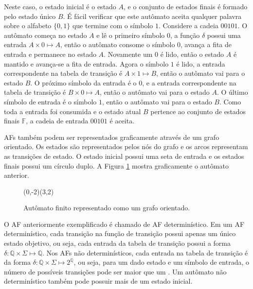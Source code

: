 \documentclass[12pt,a4paper]{article}
\let\vState=\origState
\begin{document}
Neste caso, o estado inicial é o estado $A$, e o conjunto de estados finais
é formado pelo estado único $B$. É fácil verificar que este autômato aceita
qualquer palavra sobre o alfabeto $\{0,1\}$ que termine com o símbolo $1$.
Considere a cadeia $00101$. O autômato começa no estado $A$ e lê o primeiro
símbolo $0$, a função $\delta$ possui uma entrada $A \times 0 \mapsto A$,
então o autômato consome o símbolo $0$, avança a fita de entrada e permanece
no estado $A$. Novamente um $0$ é lido, então o estado $A$ é mantido e
avança-se a fita de entrada. Agora o símbolo $1$ é lido, a entrada correspondente
na tabela de transição é $A \times 1 \mapsto B$, então o autômato vai para
o estado $B$. O próximo símbolo da entrada é o $0$, e a entrada correspondente
na tabela de transição é $B \times 0 \mapsto A$, então o autômato vai para o
estado $A$. O último símbolo de entrada é o símbolo $1$, então o autômato vai
para o estado $B$. Como toda a entrada foi consumida e o estado atual $B$
pertence ao conjunto de estados finais $\mathbb{F}$, a cadeia de entrada $00101$ é
aceita.

AFs também podem ser representados graficamente através de
um grafo orientado. Os estados são representados pelos nós do grafo
e os arcos representam as transições de estado. O estado inicial possui
uma seta de entrada e os estados finais possui um círculo duplo. A
Figura \ref{fig:automata} mostra graficamente o autômato anterior.

\begin{figure}[htp]
\begin{center}
\begin{VCPicture}{(0,-2)(3,2)}
\vState[A]{(0,0)}{A} 
 
 
\end{VCPicture}
\caption{Autômato finito representado como um grafo orientado.}
\label{fig:automata}
\end{center}
\end{figure}

O AF anteriormente exemplificado é chamado de AF determinístico.
Em um AF determinístico, cada transição na função de transição possui apenas
um único estado objetivo, ou seja, cada entrada da tabela de transição possui a forma
$\delta: \mathbb{Q} \times \Sigma \mapsto \mathbb{Q}$. Nos AFs não
determinísticos, cada entrada na tabela de transição é da forma
$\delta: \mathbb{Q} \times \Sigma \mapsto 2^{\mathbb{Q}}$,
ou seja, para um dado estado e um símbolo de entrada, o número de possíveis
transições pode ser maior que um .  Um autômato não
determinístico também pode possuir mais de um estado inicial.
\end{document}
